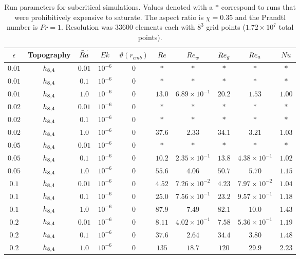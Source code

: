 \begin{table}
\begin{center}
\begin{tabular}{c c c c c c c c c c}
	\hline
\hline
$\epsilon$ & Topography & $\widetilde{Ra}$ & $Ek$ & $\vartheta(r_{cmb})$ & $Re$ & $Re_w$ & $Re_{{g}}$ & $Re_{{a}}$ & $Nu$\\
\hline
$0.01$ & $h_{8,4}$ & $0.01$ & $10^{-6}$ & 0&$*$ & $*$ & $*$ & $*$ & $*$ \\
 $0.01$ & $h_{8,4}$ & $0.1$ & $10^{-6}$ & 0&$*$ & $*$ & $*$ & $*$ & $*$ \\
 $0.01$ & $h_{8,4}$ & $1.0$ & $10^{-6}$ & 0&$13.0$ & $6.89\times 10^{-1}$ & $20.2$ & $1.53$ & $1.00$ \\
 $0.02$ & $h_{8,4}$ & $0.01$ & $10^{-6}$ & 0&$*$ & $*$ & $*$ & $*$ & $*$ \\
 $0.02$ & $h_{8,4}$ & $0.1$ & $10^{-6}$ & 0&$*$ & $*$ & $*$ & $*$ & $*$ \\
 $0.02$ & $h_{8,4}$ & $1.0$ & $10^{-6}$ & 0&$37.6$ & $2.33$ & $34.1$ & $3.21$ & $1.03$ \\
 $0.05$ & $h_{8,4}$ & $0.01$ & $10^{-6}$ & 0&$*$ & $*$ & $*$ & $*$ & $*$ \\
 $0.05$ & $h_{8,4}$ & $0.1$ & $10^{-6}$ & 0&$10.2$ & $2.35\times 10^{-1}$ & $13.8$ & $4.38\times 10^{-1}$ & $1.02$ \\
 $0.05$ & $h_{8,4}$ & $1.0$ & $10^{-6}$ & 0&$55.6$ & $4.06$ & $50.7$ & $5.70$ & $1.15$ \\
 $0.1$ & $h_{8,4}$ & $0.01$ & $10^{-6}$ & 0&$4.52$ & $7.26\times 10^{-2}$ & $4.23$ & $7.97\times 10^{-2}$ & $1.04$ \\
 $0.1$ & $h_{8,4}$ & $0.1$ & $10^{-6}$ & 0&$25.0$ & $7.56\times 10^{-1}$ & $23.2$ & $9.57\times 10^{-1}$ & $1.18$ \\
 $0.1$ & $h_{8,4}$ & $1.0$ & $10^{-6}$ & 0&$87.9$ & $7.49$ & $82.1$ & $10.0$ & $1.43$ \\
 $0.2$ & $h_{8,4}$ & $0.01$ & $10^{-6}$ & 0&$8.11$ & $4.02\times 10^{-1}$ & $7.58$ & $5.36\times 10^{-1}$ & $1.19$ \\
 $0.2$ & $h_{8,4}$ & $0.1$ & $10^{-6}$ & 0&$37.6$ & $2.64$ & $34.4$ & $3.80$ & $1.48$ \\
 $0.2$ & $h_{8,4}$ & $1.0$ & $10^{-6}$ & 0&$135$ & $18.7$ & $120$ & $29.9$ & $2.23$ \\
 \hline
 \hline
 \end{tabular}
\end{center}
\caption[Run parameters for subcritical simulations]{Run parameters for subcritical simulations.  Values denoted with a $*$ correspond to runs that were prohibitively expensive to saturate. The aspect ratio is $\chi = 0.35$ and the Prandtl number is $Pr = 1$. Resolution was $33600$ elements each with $8^3$ grid points ($1.72\times10^{7}$ total points).}

\end{table}
